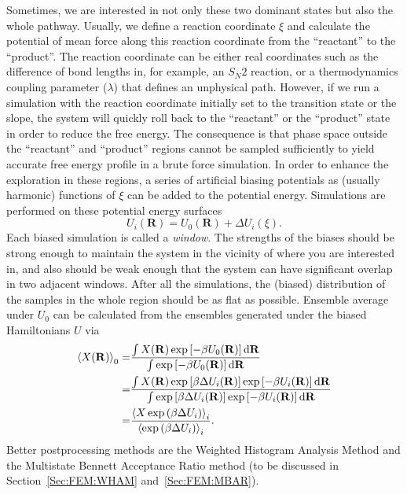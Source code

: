 Sometimes, we are interested in not only these two dominant states but also the whole pathway. Usually, we define a reaction coordinate $\xi$ and calculate the potential of mean force along this reaction coordinate from the ``reactant'' to the ``product''. The reaction coordinate can be either real coordinates such as the difference of bond lengths in, for example, an $S_N2$ reaction, or a thermodynamics coupling parameter ($\lambda$) that defines an unphysical path. However, if we run a simulation with the reaction coordinate initially set to the transition state or the slope, the system will quickly roll back to the ``reactant'' or the ``product'' state in order to reduce the free energy. The consequence is that phase space outside the ``reactant'' and ``product'' regions cannot be sampled sufficiently to yield accurate free energy profile in a brute force simulation. In order to enhance the exploration in these regions, a series of artificial biasing potentials as (usually harmonic) functions of $\xi$ can be added to the potential energy. Simulations are performed on these potential energy surfaces 
\begin{equation}
	U_i(\mathbf{R})=U_0(\mathbf{R})+\Delta U_i(\xi).
\end{equation}
Each biased simulation is called a \textit{window}. The strengths of the biases should be strong enough to maintain the system in the vicinity of where you are interested in, and also should be weak enough that the system can have significant overlap in two adjacent windows. After all the simulations, the (biased) distribution of the samples in the whole region should be as flat as possible. Ensemble average under $U_0$ can be calculated from the ensembles generated under the biased Hamiltonians $U$ via
\begin{align}
	\left<X(\mathbf{R})\right>_0=&\frac{\int X(\mathbf{R})\exp{\left[-\beta U_0(\mathbf{R})\right]}\mathop{}\!\mathrm{d}\mathbf{R}}{\int \exp{\left[-\beta U_0(\mathbf{R})\right]}\mathop{}\!\mathrm{d}\mathbf{R}}\notag\\
	                            =&\frac{\int X(\mathbf{R})\exp{\left[\beta \Delta U_i(\mathbf{R})\right]}\exp{\left[-\beta U_i(\mathbf{R})\right]}\mathop{}\!\mathrm{d}\mathbf{R}}{\int \exp{\left[\beta \Delta U_i(\mathbf{R})\right]}\exp{\left[-\beta U_i(\mathbf{R})\right]}\mathop{}\!\mathrm{d}\mathbf{R}}\notag\\
	                =&\frac{\left<X\exp{\left(\beta\Delta U_i\right)}\right>_i}{\left<\exp{\left(\beta\Delta U_i\right)}\right>_i}.
\end{align}
Better postprocessing methods are the Weighted Histogram Analysis Method and the Multistate Bennett Acceptance Ratio method (to be discussed in Section~\ref{Sec:FEM:WHAM} and~\ref{Sec:FEM:MBAR}).